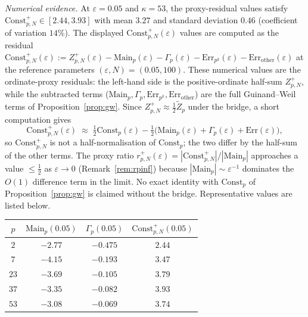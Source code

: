 \documentclass[11pt]{article}
\begin{document}
\emph{Numerical evidence.}
At $\varepsilon=0.05$ and $\kappa=53$, the proxy-residual values satisfy
$\mathrm{Const}^+_{p,N}\in[2.44,3.93]$ with mean $3.27$ and standard
deviation $0.46$ (coefficient of variation $14\%$).
The displayed $\mathrm{Const}^+_{p,N}(\varepsilon)$ values are computed
as the residual
$\mathrm{Const}^+_{p,N}(\varepsilon) := Z_{p,N}^+(\varepsilon)
  - \mathrm{Main}_p(\varepsilon)
  - \Gamma_p(\varepsilon)
  - \mathrm{Err}_{p^k}(\varepsilon)
  - \mathrm{Err}_{\mathrm{other}}(\varepsilon)$
at the reference parameters $(\varepsilon,N)=(0.05,100)$.
These numerical values are the ordinate-proxy residuals: the
left-hand side is the positive-ordinate half-sum $Z_{p,N}^+$,
while the subtracted terms ($\mathrm{Main}_p,\Gamma_p,
\mathrm{Err}_{p^k},\mathrm{Err}_{\mathrm{other}}$)
are the full Guinand--Weil terms of Proposition~\ref{prop:gw}.
Since $Z_{p,N}^+\approx\tfrac12\widetilde Z_p$ under the bridge,
a short computation gives
\[
\mathrm{Const}^+_{p,N}(\varepsilon)
\;\approx\;
\tfrac12\mathrm{Const}_p(\varepsilon)
-\tfrac12\bigl(\mathrm{Main}_p(\varepsilon)
+\Gamma_p(\varepsilon)+\mathrm{Err}(\varepsilon)\bigr),
\]
so $\mathrm{Const}^+_{p,N}$ is not a half-normalisation of
$\mathrm{Const}_p$; the two differ by the half-sum of the
other terms.
The proxy ratio
$r^+_{p,N}(\varepsilon)=|\mathrm{Const}^+_{p,N}|/|\mathrm{Main}_p|$
approaches a value $\le\tfrac12$ as $\varepsilon\to 0$
(Remark~\ref{rem:rpinf}) because $|\mathrm{Main}_p|\sim\varepsilon^{-1}$
dominates the $O(1)$ difference term in the limit.
No exact identity with $\mathrm{Const}_p$ of
Proposition~\ref{prop:gw} is claimed without the bridge.
Representative values are listed below.

\begin{center}
\begin{tabular}{cccc}
\toprule
$p$ & $\mathrm{Main}_p(0.05)$ & $\Gamma_p(0.05)$
    & $\mathrm{Const}^+_{p,N}(0.05)$ \\
\midrule
$2$  & $-2.77$ & $-0.475$ & $2.44$ \\
$7$  & $-4.15$ & $-0.193$ & $3.47$ \\
$23$ & $-3.69$ & $-0.105$ & $3.79$ \\
$37$ & $-3.35$ & $-0.082$ & $3.93$ \\
$53$ & $-3.08$ & $-0.069$ & $3.74$ \\
\bottomrule
\end{tabular}
\end{center}
\end{document}
